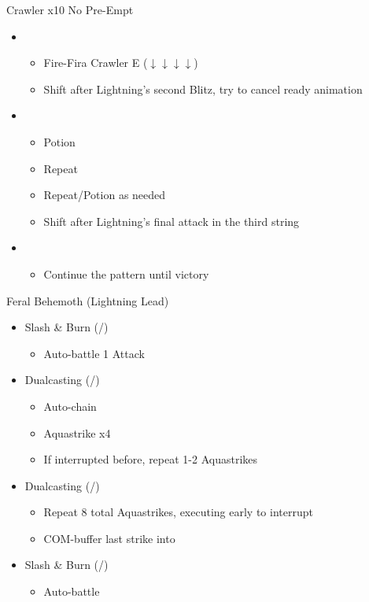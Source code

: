 \begin{multicols}{2}
\begin{battle}{Crawler x10 No Pre-Empt}
\begin{itemize}
    \item \first
    \begin{itemize}
        \item Fire-Fira Crawler E ($\downarrow \downarrow \downarrow \downarrow$)
        \item Shift after Lightning's second Blitz, try to cancel ready animation
    \end{itemize}
    \item \sixth
    \begin{itemize}
        \item Potion
        \item Repeat
        \item Repeat/Potion as needed
        \item Shift after Lightning's final attack in the third string
    \end{itemize}
    \item \first
    \begin{itemize}
        \item Continue the pattern until victory
    \end{itemize}
\end{itemize}
\end{battle}
\renewcommand{\first}{[1] Slash \& Burn (\com/\rav)}
\renewcommand{\second}{[2] War \& Peace (\com/\med)}
\renewcommand{\third}{[3] Supersoldier (\com/\syn)}
\renewcommand{\fourth}{[4] Dualcasting (\rav/\rav)}
\renewcommand{\fifth}{[5] Dualcasting (\rav/\rav)}
\renewcommand{\sixth}{[6] Slash \& Burn (\com/\rav)}
\begin{battle}{Feral Behemoth (Lightning Lead)}
\begin{itemize}
    \item \first
    \begin{itemize}
        \item Auto-battle 1 Attack
    \end{itemize}
    \item \fourth
    \begin{itemize}
        \item Auto-chain
        \item Aquastrike x4
	  \item If interrupted before, repeat 1-2 Aquastrikes
    \end{itemize}
    \item \fifth
    \begin{itemize}
        \item Repeat 8 total Aquastrikes, executing early to interrupt
        \item COM-buffer last strike into
    \end{itemize}
    \item \sixth
    \begin{itemize}
        \item Auto-battle
    \end{itemize}
\end{itemize}
\end{battle}


\end{multicols}

